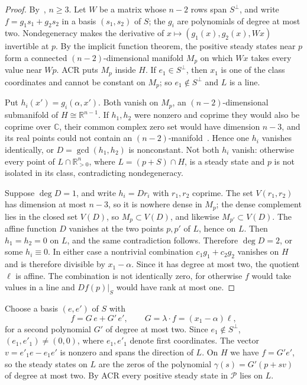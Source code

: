 \documentclass[11pt]{amsart}
\theoremstyle{definition}
\theoremstyle{remark}
\newcommand{\R}{\mathbb R}
\newcommand{\Rpos}{\mathbb R_{>0}}
\begin{document}
\begin{proof}
By~\cite[Theorem~1.2]{kns2024}, $n\ge3$. Let $W$ be a matrix whose $n-2$ rows span $S^\perp$, and write $f=g_1s_1+g_2s_2$ in a basis $(s_1,s_2)$ of $S$; the $g_i$ are polynomials of degree at most two. Nondegeneracy makes the derivative of $x\mapsto(g_1(x),g_2(x),Wx)$ invertible at $p$. By the implicit function theorem, the positive steady states near $p$ form a connected $(n-2)$-dimensional manifold $M_p$ on which $Wx$ takes every value near $Wp$. ACR puts $M_p$ inside $H$. If $e_1\in S^\perp$, then $x_1$ is one of the class coordinates and cannot be constant on $M_p$; so $e_1\notin S^\perp$ and $L$ is a line.

Put $h_i(x')=g_i(\alpha,x')$. Both vanish on $M_p$, an $(n-2)$-dimensional submanifold of $H\cong\R^{n-1}$. If $h_1,h_2$ were nonzero and coprime they would also be coprime over $\mathbb C$, their common complex zero set would have dimension $n-3$, and its real points could not contain an $(n-2)$-manifold~\cite[Section~2.8]{bcr1998}. Hence one $h_i$ vanishes identically, or $D=\gcd(h_1,h_2)$ is nonconstant. Not both $h_i$ vanish: otherwise every point of $L\cap\Rpos^n$, where $L=(p+S)\cap H$, is a steady state and $p$ is not isolated in its class, contradicting nondegeneracy.

Suppose $\deg D=1$, and write $h_i=Dr_i$ with $r_1,r_2$ coprime. The set $V(r_1,r_2)$ has dimension at most $n-3$, so it is nowhere dense in $M_p$; the dense complement lies in the closed set $V(D)$, so $M_p\subset V(D)$, and likewise $M_{p'}\subset V(D)$. The affine function $D$ vanishes at the two points $p,p'$ of $L$, hence on $L$. Then $h_1=h_2=0$ on $L$, and the same contradiction follows. Therefore $\deg D=2$, or some $h_i\equiv0$. In either case a nontrivial combination $c_1g_1+c_2g_2$ vanishes on $H$ and is therefore divisible by $x_1-\alpha$. Since it has degree at most two, the quotient $\ell$ is affine. The combination is not identically zero, for otherwise $f$ would take values in a line and $Df(p)|_S$ would have rank at most one.
\end{proof}

Choose a basis $(e,e')$ of $S$ with
\begin{equation}\label{eq:basis}
 f=G\,e+G'\,e',\qquad G=\lambda\cdot f=(x_1-\alpha)\ell,
\end{equation}
for a second polynomial $G'$ of degree at most two. Since $e_1\notin S^\perp$, $(e_1,e'_1)\neq(0,0)$, where $e_1,e'_1$ denote first coordinates. The vector $v=e'_1e-e_1e'$ is nonzero and spans the direction of $L$. On $H$ we have $f=G'e'$, so the steady states on $L$ are the zeros of the polynomial $\gamma(s)=G'(p+sv)$ of degree at most two. By ACR every positive steady state in $\mathcal P$ lies on $L$.
\end{document}
